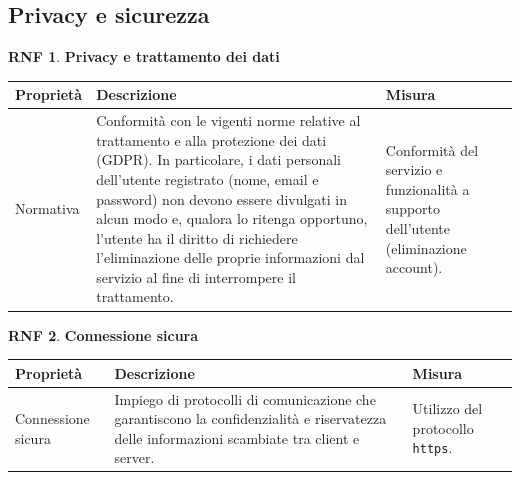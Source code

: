 \documentclass[11pt, a4paper]{article}
\theoremstyle{definition} %
\newtheorem{nonfuncreq}{RNF} %
\begin{document}
\subsection{Privacy e sicurezza}

\begin{nonfuncreq}
    \textbf{Privacy e trattamento dei dati }
    \begin{center}
        \footnotesize
        \begin{tabularx}{\textwidth}{|X||X||X|}
            \hline
            \cellcolor{red!70}Proprietà & \cellcolor{red!70}Descrizione & \cellcolor{red!70}Misura\\
            \hline
            Normativa & Conformità con le vigenti norme relative al trattamento e alla protezione dei dati (GDPR). In particolare, i dati personali dell'utente registrato (nome, email e password) non devono essere divulgati in alcun modo e, qualora lo ritenga opportuno, l'utente ha il diritto di richiedere l'eliminazione delle proprie informazioni dal servizio al fine di interrompere il trattamento. & Conformità del servizio e funzionalità a supporto dell'utente (eliminazione account).\\
            \hline
        \end{tabularx}
    \end{center}
\end{nonfuncreq}

\begin{nonfuncreq}
    \textbf{Connessione sicura }
    \begin{center}
        \footnotesize
        \begin{tabularx}{\textwidth}{|X||X||X|}
            \hline
            \cellcolor{red!70}Proprietà & \cellcolor{red!70}Descrizione & \cellcolor{red!70}Misura\\
            \hline
            Connessione sicura & Impiego di protocolli di comunicazione che garantiscono la confidenzialità e riservatezza delle informazioni scambiate tra client e server. & Utilizzo del protocollo \texttt{https}.\\
            \hline
        \end{tabularx}
    \end{center}
\end{nonfuncreq}
\end{document}
